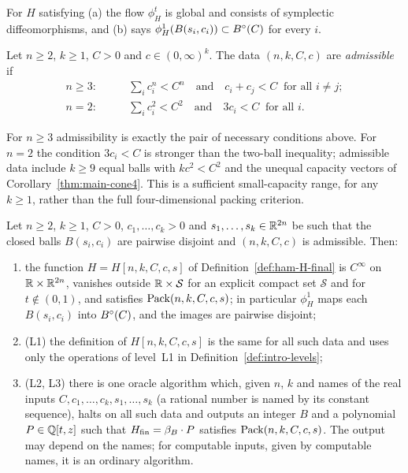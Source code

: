 For $H$ satisfying (a) the flow $\phi^t_H$ is global and consists of symplectic diffeomorphisms, and
(b) says $\phi^1_H(B(s_i,c_i))\subset B^{\circ}(C)$ for every $i$.

\begin{definition}\label{def:intro-admissible}
Let $n\ge2$, $k\ge1$, $C>0$ and $c\in(0,\infty)^k$. The data $(n,k,C,c)$ are \emph{admissible} if
\begin{align*}
 n\ge3:&\qquad \textstyle\sum_ic_i^n<C^n\quad\text{and}\quad c_i+c_j<C\ \text{ for all } i\ne j;\\
 n=2:&\qquad \textstyle\sum_ic_i^2<C^2\quad\text{and}\quad 3c_i<C\ \text{ for all } i.
\end{align*}
\end{definition}

For $n\ge3$ admissibility is exactly the pair of necessary conditions above. For $n=2$ the condition
$3c_i<C$ is stronger than the two-ball inequality; admissible data include $k\ge9$ equal balls with
$kc^2<C^2$ and the unequal capacity vectors of Corollary~\ref{thm:main-cone4}. This is a sufficient small-capacity
range, for any $k\ge1$, rather than the full four-dimensional packing criterion.

\begin{maintheorem}\label{thm:main}
Let $n\ge2$, $k\ge1$, $C>0$, $c_1,\dots,c_k>0$ and $s_1,\dots,s_k\in\mathbb{R}^{2n}$ be such that the closed balls
$B(s_i,c_i)$ are pairwise disjoint and $(n,k,C,c)$ is admissible. Then:
\begin{enumerate}[label=(\roman*)]
\item the function $H=H[n,k,C,c,s]$ of Definition~\ref{def:ham-H-final} is $C^\infty$ on $\mathbb{R}\times\mathbb{R}^{2n}$,
 vanishes outside $\mathbb{R}\times\mathcal S$ for an explicit compact set $\mathcal S$ and for $t\notin(0,1)$, and
 satisfies $\mathrm{Pack}(n,k,C,c,s)$; in particular $\phi^1_H$ maps each $B(s_i,c_i)$ into $B^{\circ}(C)$, and the
 images are pairwise disjoint;
\item \textup{(L1)} the definition of $H[n,k,C,c,s]$ is the same for all such data and uses only the
 operations of level~L1 in Definition~\ref{def:intro-levels};
\item \textup{(L2, L3)} there is one oracle algorithm which, given $n$, $k$ and names of the real inputs
 $C,c_1,\dots,c_k,s_1,\dots,s_k$ (a rational number is named by its constant sequence), halts on all such data and
 outputs an integer $B$ and a polynomial $P\in\mathbb{Q}[t,z]$ such that $H_{\mathrm{fin}}=\beta_B\cdot P$ satisfies
 $\mathrm{Pack}(n,k,C,c,s)$. The output may depend on the names; for computable inputs, given by computable names, it is an
 ordinary algorithm.
\end{enumerate}
\end{maintheorem}

